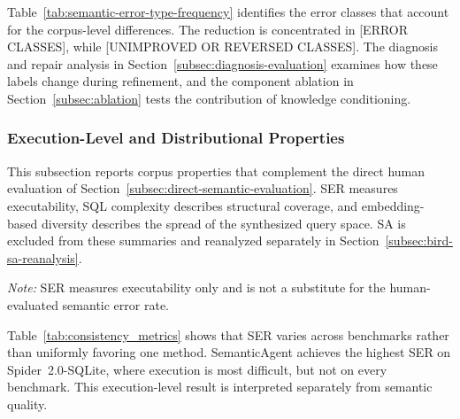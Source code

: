 \documentclass[letterpaper,journal]{IEEEtran}
\begin{document}
Table~\ref{tab:semantic-error-type-frequency} identifies the error classes that account for the corpus-level differences. The reduction is concentrated in [ERROR CLASSES], while [UNIMPROVED OR REVERSED CLASSES]. The diagnosis and repair analysis in Section~\ref{subsec:diagnosis-evaluation} examines how these labels change during refinement, and the component ablation in Section~\ref{subsec:ablation} tests the contribution of knowledge conditioning.

\subsubsection{Execution-Level and Distributional Properties}

This subsection reports corpus properties that complement the direct human evaluation of Section~\ref{subsec:direct-semantic-evaluation}. SER measures executability, SQL complexity describes structural coverage, and embedding-based diversity describes the spread of the synthesized query space. SA is excluded from these summaries and reanalyzed separately in Section~\ref{subsec:bird-sa-reanalysis}.

\begin{table}[!ht]
\centering
\caption{Successful execution rate (SER) of synthesized corpora. Higher values indicate a larger proportion of executable synthesized SQL queries.}
\label{tab:consistency_metrics}
\begin{minipage}{0.5\textwidth}
\footnotesize
\vspace{1mm}
\textit{Note:} SER measures executability only and is not a substitute for the human-evaluated semantic error rate.
\end{minipage}
\end{table}

Table~\ref{tab:consistency_metrics} shows that SER varies across benchmarks rather than uniformly favoring one method. SemanticAgent achieves the highest SER on Spider~2.0-SQLite, where execution is most difficult, but not on every benchmark. This execution-level result is interpreted separately from semantic quality.
\end{document}
